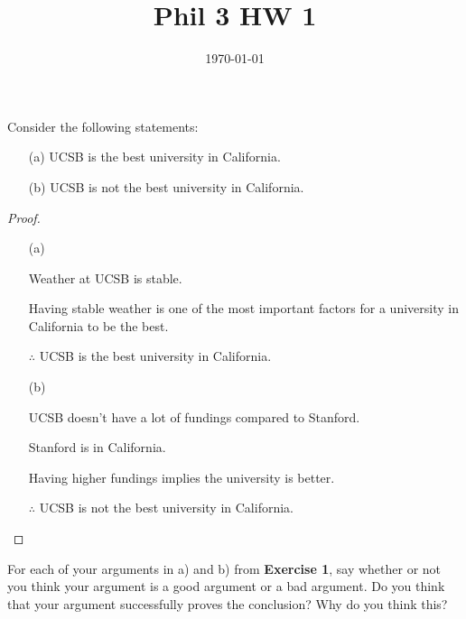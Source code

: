 \documentclass{article}
\title{Phil 3 HW 1}
\date{\today}
\begin{document}
\maketitle

\begin{ques}\label{q1}
    Consider the following statements:
    \begin{itemize}
        \item[(a)] UCSB is the best university in California.
        \item[(b)] UCSB is not the best university in California. 
    \end{itemize}
\end{ques}

\begin{proof}
    
    \hfil

    \begin{itemize}
        \item[(a)]
        
        Weather at UCSB is stable.

        Having stable weather is one of the most important factors for a university in California to be the best.

        $\therefore$ UCSB is the best university in California.

        \item[(b)]
        
        UCSB doesn't have a lot of fundings compared to Stanford.

        Stanford is in California.

        Having higher fundings implies the university is better.

        $\therefore$ UCSB is not the best university in California.
    \end{itemize}
\end{proof}

\hfil

\begin{ques}
    For each of your arguments in a) and b) from \textbf{Exercise 1}, say whether or not you think your argument is a good argument or a bad argument. Do you think that your argument successfully proves the conclusion? Why do you think this?
\end{ques}\label{q2}
\end{document}
